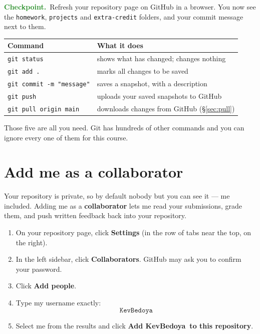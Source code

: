 \documentclass[11pt]{article}
\newcommand{\checkpoint}[1]{\par\smallskip\noindent
  {\small\sffamily\textcolor{ForestGreen}{\textbf{Checkpoint.}}\ #1}\par\smallskip}
\newcommand{\instructorgh}{KevBedoya}   %
\begin{document}
\checkpoint{Refresh your repository page on GitHub in a browser. You now see the
\texttt{homework}, \texttt{projects} and \texttt{extra-credit} folders, and your
commit message next to them.}

\begin{center}
\renewcommand{\arraystretch}{1.4}
\begin{tabular}{@{}l l@{}}
\toprule
\textbf{Command} & \textbf{What it does} \\
\midrule
\texttt{git status}              & shows what has changed; changes nothing \\
\texttt{git add .}               & marks all changes to be saved \\
\texttt{git commit -m "message"} & saves a snapshot, with a description \\
\texttt{git push}                & uploads your saved snapshots to GitHub \\
\texttt{git pull origin main}    & downloads changes from GitHub
                                   (\S\ref{sec:pull}) \\
\bottomrule
\end{tabular}
\end{center}

\noindent Those five are all you need. Git has hundreds of other commands and
you can ignore every one of them for this course.

\section{Add me as a collaborator}
Your repository is private, so by default nobody but you can see it --- me
included. Adding me as a \textbf{collaborator} lets me read your submissions,
grade them, and push written feedback back into your repository.

\begin{enumerate}[leftmargin=2.0em,itemsep=4pt]
  \item On your repository page, click \textbf{Settings} (in the row of tabs
        near the top, on the right).
  \item In the left sidebar, click \textbf{Collaborators}. GitHub may ask you to
        confirm your password.
  \item Click \textbf{Add people}.
  \item Type my username exactly:
        \[
          \texttt{\instructorgh}
        \]
  \item Select me from the results and click \textbf{Add \instructorgh\ to this
        repository}.
\end{enumerate}
\end{document}
